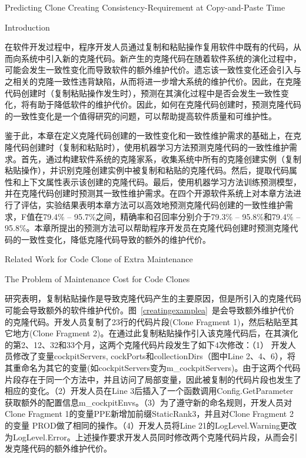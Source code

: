 
{Predicting Clone Creating Consistency-Requirement at Copy-and-Paste Time}

{Introduction}

在软件开发过程中，程序开发人员通过复制和粘贴操作复用软件中既有的代码，从而向系统中引入新的克隆代码。新产生的克隆代码在随着软件系统的演化过程中，可能会发生一致性变化而导致软件的额外维护代价。遗忘该一致性变化还会引入与之相关的克隆一致性违背缺陷，从而将进一步增大系统的维护代价。因此，在克隆代码创建时（复制粘贴操作发生时），预测在其演化过程中是否会发生一致性变化，将有助于降低软件的维护代价。因此，如何在克隆代码创建时，预测克隆代码的一致性变化是一个值得研究的问题，可以帮助提高软件质量和可维护性。

鉴于此，本章在定义克隆代码创建的一致性变化和一致性维护需求的基础上，在克隆代码创建时（复制和粘贴时），使用机器学习方法预测克隆代码的一致性维护需求。首先，通过构建软件系统的克隆家系，收集系统中所有的克隆创建实例（复制粘贴操作），并识别克隆创建实例中被复制和粘贴的克隆代码。然后，提取代码属性和上下文属性表示该创建的克隆代码。最后，使用机器学习方法训练预测模型，并在克隆代码创建时预测其一致性维护需求。在四个开源软件系统上对本章方法进行了评估，实验结果表明本章方法可以高效地预测克隆代码创建的一致性维护需求，F值在79.4\% -- 95.7\%之间，精确率和召回率分别介于79.3\% -- 95.8\%和79.4\% -- 95.8\%。本章所提出的预测方法可以帮助程序开发员在克隆代码创建时预测克隆代码的一致性变化，降低克隆代码导致的额外的维护代价。

{Related Work for Code Clone of Extra Maintenance}

{The Problem of Maintenance Cost for Code Clones}

研究表明，复制粘贴操作是导致克隆代码产生的主要原因，但是所引入的克隆代码可能会导致额外的软件维护代价。图~\ref{creatingexamplea}~是会导致额外维护代价的克隆代码。开发人员复制了23行的代码片段(Clone Fragment 1)，然后粘贴至其它地方(Clone Fragment 2)。在通过此复制粘贴操作引入该克隆代码后，在其演化的第2、12、32和33个月，这两个克隆代码片段发生了如下4次修改：（1） 开发人员修改了变量{cockpitServers, cockPorts}和{collectionDirs}（图中Line 2、4、6），将其重命名为其它的变量(如{cockpitServers}变为{m\_cockpitServers})。由于这两个代码片段存在于同一个方法中，并且访问了局部变量，因此被复制的代码片段也发生了相应的变化。（2）开发人员在Line 3后插入了一个函数调用{Config.GetParameter}获取额外的配置信息{m\_cockpitEnvs}。（3）为了遵守新的命名规则，开发人员对Clone Fragment 1的变量{PPE}新增加前缀{StaticRank3}，并且对Clone Fragment 2的变量{ PROD}做了相同的操作。（4）开发人员将Line 21的{LogLevel.Warning}更改为{LogLevel.Error}。上述操作要求开发人员同时修改两个克隆代码片段，从而会引发克隆代码的额外维护代价。

